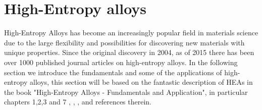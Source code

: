 \chapter{High-Entropy alloys}
\label{sec:HEA}

High-Entropy Alloys has become an increasingly popular field in materials science due to the large flexibility and possibilities for discovering new materials with unique properties. Since the original discovery in 2004, as of 2015 there has been over 1000 published journal articles on high-entropy alloys. In the following section we introduce the fundamentals and some of the applications of high-entropy alloys, this section will be based on the fantastic description of HEAs in the book "High-Entropy Alloys - Fundamentals and Application", in particular chapters 1,2,3 and 7 \cite{hea2016_ch1}, \cite{hea2016_ch2}, \cite{hea2016_ch3}, \cite{hea2016_ch7} and references therein.

